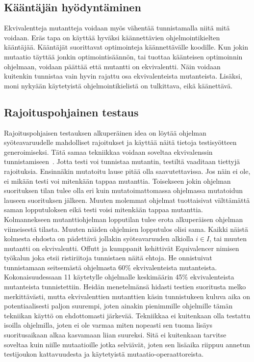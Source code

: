 \documentclass{tktltiki}
\begin{document}
\subsection{Kääntäjän hyödyntäminen}
Ekvivalentteja mutantteja voidaan myös vähentää tunnistamalla niitä mitä voidaan. Eräs tapa on käyttää hyväksi käännettävien ohjelmointikielten kääntäjää. Kääntäjät suorittavat optimointeja käännettävälle koodille. Kun jokin mutaatio täyttää jonkin optimointisäännön, tai tuottaa käänteisen optimoinnin ohjelmaan, voidaan päättää että mutantti on ekvivalentti. Näin voidaan kuitenkin tunnistaa vain hyvin rajattu osa ekvivalenteista mutanteista. Lisäksi, moni nykyään käytetyistä ohjelmointikielistä on tulkittava, eikä käänettävä.

\subsection{Rajoituspohjainen testaus}
Rajoituspohjaisen testauksen alkuperäinen idea on löytää ohjelman syöteavaruudelle mahdolliset rajoitukset ja käyttää näitä tietoja testisyötteen generoimiseksi. Tätä samaa tekniikkaa voidaan soveltaa ekvivalenssin tunnistamiseen~\cite{OffuttP96}. Jotta testi voi tunnistaa mutantin, testiltä vaaditaan tiettyjä rajoituksia. Ensinnäkin mutatoitu lause pitää olla saavutettavissa. Jos näin ei ole, ei mikään testi voi mitenkään tappaa mutanttia. Toisekseen jokin ohjelman suorituksen tilan tulee olla eri kuin mutatoimattomassa ohjelmassa mutatoidun lauseen suorituksen jälkeen. Muuten molemmat ohjelmat tuottaisivat välttämättä saman lopputuloksen eikä testi voisi mitenkään tappaa mutanttia. Kolmannekseen mutanttiohjelman lopputilan tulee erota alkuperäisen ohjelman viimeisestä tilasta. Muuten näiden ohjelmien lopputulos olisi sama. Kaikki näistä kolmesta ehdosta on pädettävä jollakin syöteavaruuden alkiolla $i \in I$, tai muuten mutantti on ekvivalentti. Offutt ja kumppanit kehittivät Equivalencer nimisen työkalun joka etsii ristiriitoja tunnistaen näitä ehtoja. He onnistuivat tunnistamaan seitsemästä ohjelmasta 60\% ekvivalenteista mutanteista. Kokonaisuudessaan 11 käytetylle ohjelmalle keskimäärin 45\% ekvivalenteista mutanteista tunnistettiin. Heidän menetelmänsä hidasti testien suoritusta melko merkittävästi, mutta ekvivalenttien mutanttien käsin tunnistukeen kuluva aika on potentiaalisesti paljon suurempi, joten ainakin pienimmille ohjelmille tämän tekniikan käyttö on ehdottomasti järkevää. Tekniikkaa ei kuitenkaan olla testattu isoilla ohjelmilla, joten ei ole varmaa miten nopeasti sen tuoma lisäys suoritusaikaan alkaa kasvamaan liian suureksi. Sitä ei kuitenkaan tarvitse soveltaa kuin niille mutaatioille jotka selviävät, joten sen lisäaika riippuu annetun testijoukon kattavuudesta ja käytetyistä mutaatio-operaattoreista.
\end{document}
